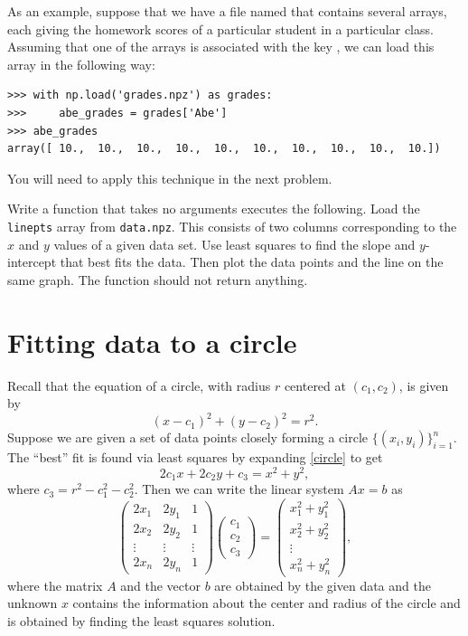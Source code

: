 As an example, suppose that we have a file named  that contains several arrays, each giving the
homework scores of a particular student in a particular class. Assuming that one of the arrays is associated with
the key , we can load this array in the following way:

\begin{lstlisting}
>>> with np.load('grades.npz') as grades:
>>>     abe_grades = grades['Abe']
>>> abe_grades
array([ 10.,  10.,  10.,  10.,  10.,  10.,  10.,  10.,  10.,  10.])
\end{lstlisting}

You will need to apply this technique in the next problem.

\begin{problem}
Write a function  that takes no arguments executes the following.
Load the \texttt{linepts} array from \texttt{data.npz}.
This consists of two columns corresponding to the $x$ and $y$ values of a given data set.  Use least squares to find the slope and $y$-intercept that best fits the data.  Then plot the data points and the line on the same graph.
The function should not return anything.
\end{problem}

\section*{Fitting data to a circle}

Recall that the equation of a circle, with radius $r$ centered at $(c_1,c_2)$, is given by
\begin{equation}
\label{circle}
(x-c_1)^2 + (y-c_2)^2 = r^2.
\end{equation}
Suppose we are given a set of data points closely forming a circle $\{(x_i,y_i)\}^n_{i=1}$.  The ``best'' fit is found via least squares by expanding \eqref{circle} to get
\[
2 c_1 x + 2 c_2 y + c_3 = x^2 + y^2,
\]
where $c_3 = r^2 - c_1^2 - c_2^2$.  Then we can write the linear system $A x = b$ as
\[
\begin{pmatrix}
2 x_1 & 2 y_1 & 1\\
2 x_2 & 2 y_2 & 1\\
\vdots & \vdots & \vdots \\
2 x_n & 2 y_n & 1
\end{pmatrix}
\begin{pmatrix}
c_1\\
c_2\\
c_3
\end{pmatrix}=
\begin{pmatrix}
x_1^2 + y_1^2\\
x_2^2 + y_2^2\\
\vdots\\
x_n^2 + y_n^2
\end{pmatrix},
\]
where the matrix $A$ and the vector $b$ are obtained by the given data and the unknown $x$ contains the information about the center and radius of the circle and is obtained by finding the least squares solution.

